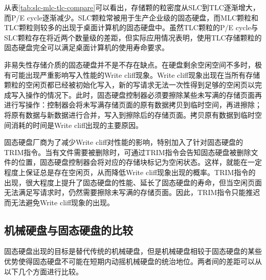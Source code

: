 \begin{enumerate}
从表\ref{tab:slc-mlc-tlc-compare}可以看出，存储颗的粒密度从SLC到TLC逐渐增大，而P/E cycle逐渐减少。SLC颗粒常被用于生产企业级的固态硬盘，而MLC颗粒和TLC颗粒则较多的出现于桌面计算机的固态硬盘中。虽然TLC颗粒的P/E cycle与SLC颗粒存在将近两个数量级的差距，但实际应用情况表明，使用TLC存储颗粒的固态硬盘完全可以满足桌面计算机的使用寿命要求。

非易失性存储介质的固态硬盘并不是不存在缺点。在硬盘剩余空闲空间不多时，极有可能出现严重影响写入性能的Write cliff现象。Write cliff现象出现在当所有存储颗粒的空闲页都已经被初始化写入，新的写请求无法一次性得到足够的空闲页以完成写入操作的情况下。此时，固态硬盘控制器必须要擦除某些未写满的存储页面再进行写操作：控制器会将未写满存储页面的原有数据拷贝到临时空间，再进擦除；将原有数据与新数据进行合并，写入到擦除后的存储页面。拷贝原有数据到临时空间消耗的时间是Write cliff出现的主要原因。

固态硬盘厂商为了减少Write cliff对性能的影响，特别加入了针对固态硬盘的TRIM指令。当有文件需要被删除时，可通过TRIM指令会告知固态硬盘被删除文件的位置，固态硬盘控制器会将对应的存储块标记为空闲状态。这样，就能在一定程度上保证总是存在空闲页，从而降低Write cliff现象出现的概率。TRIM指令的出现，很大程度上提升了固态硬盘的性能、延长了固态硬盘的寿命，但当空闲页面无法满足写请求时，仍然需要擦除未写满的存储页面。因此，TRIM指令只能推迟而无法避免Write cliff现象的出现。
\end{enumerate}

\subsection{机械硬盘与固态硬盘的比较}
固态硬盘出现的目标是替代传统的机械硬盘，但是机械硬盘相较于固态硬盘的某些优势使得固态硬盘不可能在短期内动摇机械硬盘的统治地位。两者间的差距可以从以下几个方面进行比较。


